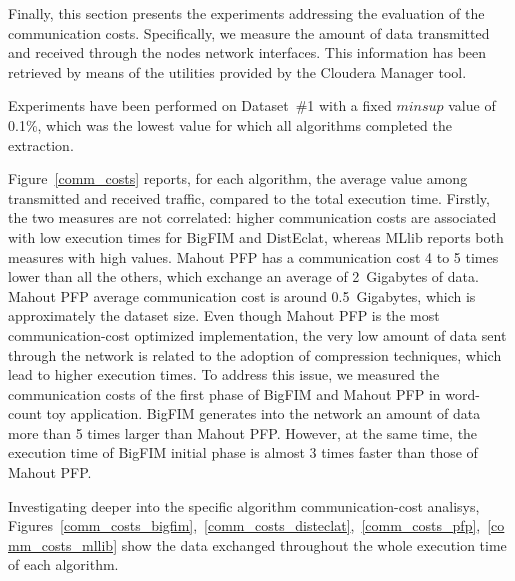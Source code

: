 Finally, this section presents the experiments addressing the evaluation of
the communication costs.
Specifically, we measure the amount of data transmitted and received
through the nodes network interfaces. This information has been retrieved
by means of the utilities provided by the Cloudera Manager tool.

Experiments have been performed on Dataset~\#1 with a fixed $minsup$ value of 0.1\%,
which was the lowest value for which all algorithms completed the extraction.

Figure~\ref{comm_costs} reports, for each algorithm, the average value
among transmitted and received traffic, compared to the total execution time.
Firstly, the two measures are not correlated:
higher communication costs are associated with low execution times
for BigFIM and DistEclat, whereas MLlib reports both measures with high values.
Mahout PFP has a communication cost 4 to 5 times lower than all the others,
which exchange an average of 2~Gigabytes of data.
Mahout PFP average communication cost is around 0.5~Gigabytes,
which is approximately the dataset size.
Even though Mahout PFP is the most communication-cost optimized implementation,
the very low amount of data sent through the network is related
to the adoption of compression techniques, which lead to higher execution times.
To address this issue,
we measured the communication costs of the first phase of BigFIM and Mahout PFP
in word-count toy application. BigFIM generates into the network an
amount of data more than 5 times larger than Mahout PFP.
However, at the same time, the execution time of BigFIM initial phase is
almost 3 times faster than those of Mahout PFP.

Investigating deeper into the specific algorithm communication-cost analisys,   
Figures~\ref{comm_costs_bigfim},~\ref{comm_costs_disteclat},~\ref{comm_costs_pfp},~\ref{comm_costs_mllib}
show the data exchanged throughout the whole execution time
of each algorithm.

